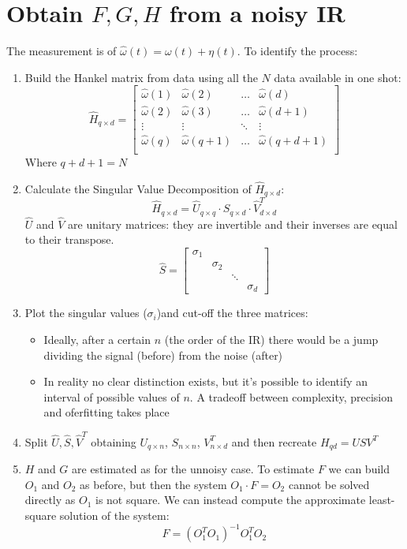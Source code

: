 \documentclass{article}
\begin{document}
\section{Obtain $F,G,H$ from a noisy IR}
The measurement is of $\hat{\omega}(t)=\omega(t)+\eta(t)$. To identify the process:
\begin{enumerate}
\item Build the Hankel matrix from data using all the $N$ data available in one shot:
\[
\hat{H}_{q \times d}=
\begin{bmatrix}
\hat{\omega}(1)&\hat{\omega}(2)&\dots&\hat{\omega}(d)\\
\hat{\omega}(2)&\hat{\omega}(3)&\dots&\hat{\omega}(d+1)\\
\vdots&\vdots&\ddots&\vdots\\
\hat{\omega}(q)&\hat{\omega}(q+1)&\dots&\hat{\omega}(q+d+1)\\
\end{bmatrix}
\]
Where $q+d+1=N$
\item Calculate the Singular Value Decomposition of $\hat{H}_{q \times d}$:
\[
\hat{H}_{q \times d}=\hat{U}_{q \times q} \cdot \hat{S}_{q \times d} \cdot \hat{V}^T_{d \times d}
\]
$\hat{U}$ and $\hat{V}$ are unitary matrices: they are invertible and their inverses are equal to their transpose.
\[
\hat{S}=\begin{bmatrix}
\sigma_1\\
&\sigma_2\\
&&\ddots\\
&&&\sigma_d
\end{bmatrix}
\]
\item Plot the singular values ($\sigma_i$)and cut-off the three matrices:
	\begin{itemize}
	\item Ideally, after a certain $n$ (the order of the IR) there would be a jump dividing the signal (before) from the noise (after)
	\item In reality no clear distinction exists, but it's possible to identify an interval of possible values of $n$. A tradeoff between complexity, precision and oferfitting takes place
	\end{itemize}
\item Split $\hat{U},\hat{S},\hat{V}^T$ obtaining $U_{q \times n}$, $S_{n \times n}$, $V^T_{n \times d}$ and then recreate $H_{qd}=USV^T$
\item $H$ and $G$ are estimated as for the unnoisy case. To estimate $F$ we can build $O_1$ and $O_2$ as before, but then the system $O_1 \cdot F = O_2$ cannot be solved directly as $O_1$ is not square. We can instead compute the approximate least-square solution of the system:
\[
F=(O_1^TO_1)^{-1}O_1^TO_2
\]
\end{enumerate}
\end{document}
